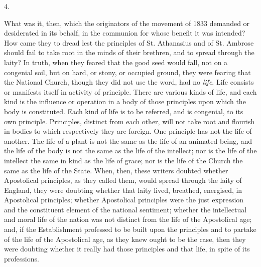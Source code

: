 4.

What was it, then, which the originators of the movement of 1833
demanded or desiderated in its behalf, in the communion for whose
benefit it was intended? How came they to dread lest the principles of
St. Athanasius and of St. Ambrose should fail to take root in the
minds of their brethren, and to spread through the laity? In truth,
when they feared that the good seed would fall, not on a congenial
soil, but on hard, or stony, or occupied ground, they were fearing
that the National Church, though they did not use the word, had no \emph{life}.
Life consists or manifests itself in activity of principle. There are
various kinds of life, and each kind is the influence or operation in
a body of those principles upon which the body is constituted. Each
kind of life is to be referred, and is congenial, to its own
principle. Principles, distinct from each other, will not take root
and flourish in bodies to which respectively they are foreign. One
principle has not the life of another. The life of a plant is not the
same as the life of an animated being, and the life of the body is not
the same as the life of the intellect; nor is the life of the
intellect the same in kind as the life of grace; nor is the life of
the Church the same as the life of the State. When, then, these
writers doubted whether Apostolical principles, as they called them,
would spread through the laity of England, they were doubting whether
that laity lived, breathed, energised, in Apostolical principles;
whether Apostolical principles were the just expression and the
constituent element of the national sentiment; whether the
intellectual and moral life of the nation was not distinct from the
life of the Apostolical age; and, if the Establishment professed to be
built upon the principles and to partake of the life of the
Apostolical age, as they knew ought to be the case, then they were
doubting whether it really had those principles and that life, in
spite of its professions.

